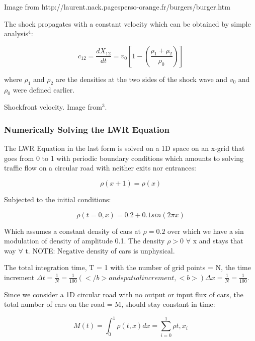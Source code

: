 \documentclass[11pt]{article}
\begin{document}
Image from http://laurent.nack.pagesperso-orange.fr/burgers/burger.htm

The shock propagates with a constant velocity which can be obtained by
simple analysis\(^4\):

\begin{equation}
    c_{12} = \frac{dX_{12}}{dt} = v_0 \left[ 1-\left( \frac{\rho_1+\rho_2}{\rho_0} \right)\right]     
\end{equation}

where \(\rho_1\) and \(\rho_2\) are the densities at the two sides of
the shock wave and \(v_0\) and \(\rho_0\) were defined earlier.

 Shockfront velocity. Image from\(^3\).

\subsubsection{Numerically Solving the LWR
Equation}\label{numerically-solving-the-lwr-equation}

The LWR Equation in the last form is solved on a 1D space on an x-grid
that goes from 0 to 1 with periodic boundary conditions which amounts to
solving traffic flow on a circular road with neither exits nor
entrances:

\begin{equation}
    \rho(x+1) = \rho(x)
\end{equation}

Subjected to the initial conditions:

\begin{equation}
    \rho(t=0,x) = 0.2 + 0.1sin(2\pi x)
\end{equation}

Which assumes a constant density of cars at \(\rho=0.2\) over which we
have a sin modulation of density of amplitude 0.1. The density
\(\rho>0\) \(\forall\) x and stays that way \(\forall\) t. NOTE:
Negative density of cars is unphysical.

The total integration time, T = 1 with the number of grid points = N,
the time increment $\Delta t=\frac{1}{N}=\frac{1}{100}
(</b> and spatial increment, <b>)\Delta x=\frac{1}{N}=\frac{1}{100}$.

Since we consider a 1D circular road with no output or input flux of
cars, the total number of cars on the road = M, should stay constant in
time:

\begin{equation}
    M(t) = \int_{0}^{1} \rho(t,x)dx = \sum_{i=0}^{1} \rho{t,x_i} 
\end{equation}
\end{document}
